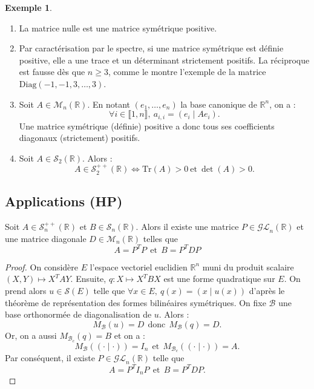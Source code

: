 \documentclass[french]{article}
\newcommand{\R}{\mathbb{R}}
\newcommand{\Tr}{\text{Tr}}
\theoremstyle{plain}
\theoremstyle{definition}
\newtheorem*{ex}{Exemple}
\theoremstyle{remark}
\begin{document}
\begin{ex}
	\begin{enumerate}
		\item La matrice nulle est une matrice symétrique positive.
		\item Par caractérisation par le spectre, si une matrice symétrique est définie positive, elle a une trace et un déterminant strictement positifs. La réciproque est fausse dès que $n\geqslant 3$, comme le montre l'exemple de la matrice $\text{Diag}(-1,-1,3,\ldots,3)$.
		\item Soit $A\in\mathcal{M}_n(\R)$. En notant $(e_1,\ldots,e_n)$ la base canonique de $\R^n$, on a : $$\forall i\in\llbracket1,n\rrbracket,\ a_{i,i}=(e_i\mid Ae_i).$$ Une matrice symétrique (définie) positive a donc tous ses coefficients diagonaux (strictement) positifs.
		\item Soit $A\in\mathcal{S}_2(\R)$. Alors : $$A\in\mathcal{S}_2^{++}(\R)\iff \Tr(A)>0\ \text{et}\ \det(A)>0.$$
	\end{enumerate}
\end{ex}

\subsection{Applications (HP)}

\begin{thm}
	Soit $A\in\mathcal{S}_n^{++}(\R)$ et $B\in\mathcal{S}_n(\R)$. Alors il existe une matrice $P\in\mathcal{GL}_n(\R)$ et une matrice diagonale $D\in\mathcal{M}_n(\R)$ telles que $$A=P^TP\ \ \text{et}\ \ B=P^TDP$$
\end{thm}

\begin{proof}
	On considère $E$ l'espace vectoriel euclidien $\R^n$ muni du produit scalaire $(X,Y)\mapsto X^TAY$. Ensuite, $q:X\mapsto X^TBX$ est une forme quadratique sur $E$. On prend alors $u\in\mathcal{S}(E)$ telle que $\forall x\in E,\ q(x)=(x\mid u(x))$ d'après le théorème de représentation des formes bilinéaires symétriques. On fixe $\mathcal{B}$ une base orthonormée de diagonalisation de $u$. Alors : $$M_\mathcal{B}(u)=D\ \ \text{donc} \ \ M_\mathcal{B}(q)=D.$$ Or, on a aussi $M_{\mathcal{B}_c}(q)=B$ et on a : $$M_\mathcal{B}((\cdot\mid\cdot))=I_n \ \ \text{et} \ \ M_{\mathcal{B}_c}((\cdot\mid\cdot))=A.$$ Par conséquent, il existe $P\in\mathcal{GL}_n(\R)$ telle que $$A=P^TI_nP\ \ \text{et}\ \ B=P^TDP.$$
\end{proof}
\end{document}
